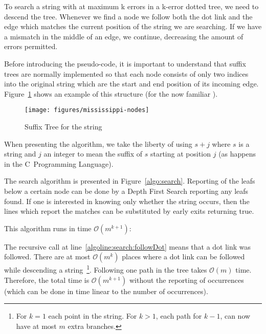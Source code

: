 To search a string with at maximum k errors in a k-error dotted tree, we need to descend the tree. Whenever we find a node we follow both the dot link and the edge which matches the current position of the string we are searching. If we have a mismatch in the middle of an edge, we continue, decreasing the amount of errors permitted.

Before introducing the pseudo-code, it is important to understand that suffix trees are normally implemented so that each node consists of only two indices into the original string which are the start and end position of its incoming edge. Figure~\ref{fig:mississippi-nodes} shows an example of this structure (for the now familiar ).

\begin{figure}
\texttt{[image: figures/mississippi-nodes]}
\caption{Suffix Tree for the string }%
\label{fig:mississippi-nodes}
\end{figure}

When presenting the algorithm, we take the liberty of using $s+j$ where $s$ is a string and $j$ an integer to mean the suffix of $s$ starting at position $j$ (as happens in the C~Programming Language).



The search algorithm is presented in Figure~\ref{algo:search}. Reporting of the leafs below a certain node can be done by a Depth First Search reporting any leafs found. If one is interested in knowing only whether the string occurs, then the lines which report the matches can be substituted by early exits returning true.

This algorithm runs in time $\mathcal{O}(m^{k+1})$:

The recursive call at line~\ref{algoline:search:followDot} means that a dot link was followed. There are at most $\mathcal{O}(m^k)$ places where a dot link can be followed while descending a string~\footnote{For $k=1$ each point in the string. For $k>1$, each path for $k-1$, can now have at most $m$ extra branches.}. Following one path in the tree takes $\mathcal{O}(m)$ time. Therefore, the total time is $\mathcal{O}(m^{k+1})$ without the reporting of occurrences (which can be done in time linear to the number of occurrences).
